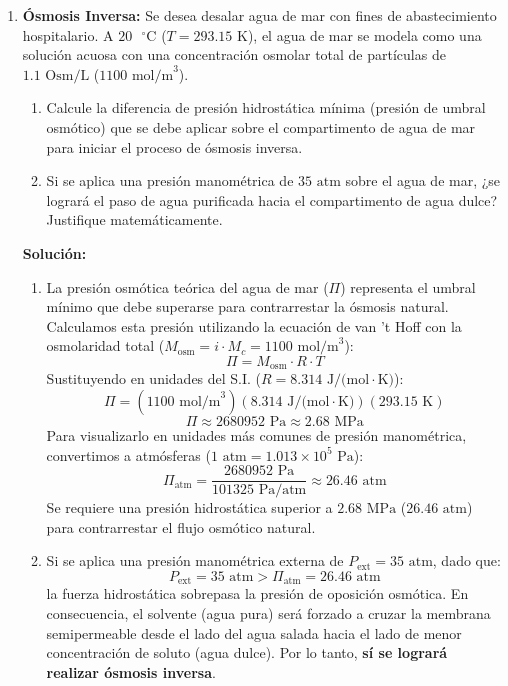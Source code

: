 \documentclass[12pt,letterpaper]{article}
\begin{document}
\begin{enumerate}
    \vspace{0.3cm}
    \item \textbf{Ósmosis Inversa:} Se desea desalar agua de mar con fines de abastecimiento hospitalario. A $20 \text{ }^{\circ}\text{C}$ ($T = 293.15 \text{ K}$), el agua de mar se modela como una solución acuosa con una concentración osmolar total de partículas de $1.1 \text{ Osm/L}$ ($1100 \text{ mol/m}^3$).
    \begin{enumerate}
        \item Calcule la diferencia de presión hidrostática mínima (presión de umbral osmótico) que se debe aplicar sobre el compartimento de agua de mar para iniciar el proceso de ósmosis inversa.
        \item Si se aplica una presión manométrica de $35 \text{ atm}$ sobre el agua de mar, ¿se logrará el paso de agua purificada hacia el compartimento de agua dulce? Justifique matemáticamente.
    \end{enumerate}
    
    \textbf{Solución:}
    \begin{enumerate}
        \item La presión osmótica teórica del agua de mar ($\Pi$) representa el umbral mínimo que debe superarse para contrarrestar la ósmosis natural.
        Calculamos esta presión utilizando la ecuación de van 't Hoff con la osmolaridad total ($M_{\text{osm}} = i \cdot M_c = 1100 \text{ mol/m}^3$):
        \[
        \Pi = M_{\text{osm}} \cdot R \cdot T
        \]
        Sustituyendo en unidades del S.I. ($R = 8.314 \text{ J/(mol}\cdot\text{K)}$):
        \[
        \Pi = (1100 \text{ mol/m}^3)(8.314 \text{ J/(mol}\cdot\text{K)})(293.15 \text{ K})
        \]
        \[
        \Pi \approx 2680952 \text{ Pa} \approx 2.68 \text{ MPa}
        \]
        Para visualizarlo en unidades más comunes de presión manométrica, convertimos a atmósferas ($1 \text{ atm} = 1.013 \times 10^5 \text{ Pa}$):
        \[
        \Pi_{\text{atm}} = \frac{2680952 \text{ Pa}}{101325 \text{ Pa/atm}} \approx 26.46 \text{ atm}
        \]
        Se requiere una presión hidrostática superior a $2.68 \text{ MPa}$ ($26.46 \text{ atm}$) para contrarrestar el flujo osmótico natural.
        
        \item Si se aplica una presión manométrica externa de $P_{\text{ext}} = 35 \text{ atm}$, dado que:
        \[
        P_{\text{ext}} = 35 \text{ atm} > \Pi_{\text{atm}} = 26.46 \text{ atm}
        \]
        la fuerza hidrostática sobrepasa la presión de oposición osmótica. En consecuencia, el solvente (agua pura) será forzado a cruzar la membrana semipermeable desde el lado del agua salada hacia el lado de menor concentración de soluto (agua dulce). Por lo tanto, \textbf{sí se logrará realizar ósmosis inversa}.
    \end{enumerate}

\end{enumerate}
\end{document}

